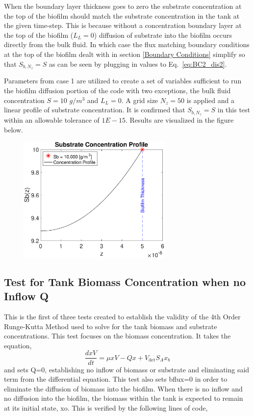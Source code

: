 \documentclass[letterpaper, twoside]{article}
\numberwithin{equation}{section}
\begin{document}
When the boundary layer thickness goes to zero the substrate concentration at the top of the biofilm should match the substrate concentration in the tank at the given time-step. This is because without a concentration boundary layer at the top of the biofilm ($L_L=0$) diffusion of substrate into the biofilm occurs directly from the bulk fluid. In which case the flux matching boundary conditions at the top of the biofilm dealt with in section \ref{Boundary Conditions} simplify so that $S_{b,N_z}=S$ as can be seen by plugging in values to Eq.~\ref{eq:BC2_dis2}.

Parameters from case 1 are utilized to create a set of variables sufficient to run the biofilm diffusion portion of the code with two exceptions, the bulk fluid concentration $S=10$ $g/m^3$ and $L_L=0$. A grid size $N_z=50$ is applied and a linear profile of substrate concentration. It is confirmed that $S_{b,N_z}=S$ in this test within an allowable tolerance of $1E-15$. Results are visualized in the figure below.

\begin{figure}[H]
  \centering
  \includegraphics[read=eps, width=3in]{BoundaryLayer_Figure1.eps}
\end{figure}

\subsection{Test for Tank Biomass Concentration when no Inflow Q}
This is the first of three tests created to establish the validity of the 4th Order Runge-Kutta Method used to solve for the tank biomass and substrate concentrations. This test focuses on the biomass concentration. It takes the equation,
\begin{equation}
  \frac{dx V}{dt} = \mu xV - Q x +V_{\mathrm{det}} S_A x_b
\end{equation}
and sets Q=0, establishing no inflow of biomass or substrate and eliminating said term from the differential equation. 
This test also sets bflux=0 in order to eliminate the diffusion of biomass into the biofilm. 
When there is no inflow and no diffusion into the biofilm, the biomass within the tank is expected to remain at its initial state, xo. This is verified by the following lines of code,
\end{document}
